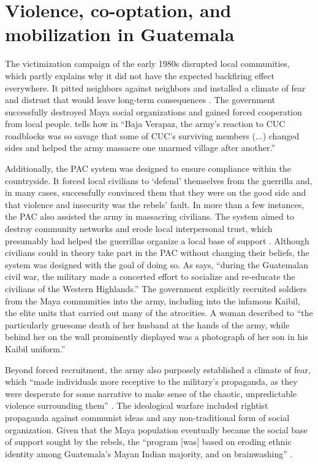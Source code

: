 \documentclass[12pt, notitlepage]{article}
\begin{document}
\section*{Violence, co-optation, and mobilization in Guatemala}

The victimization campaign of the early 1980s disrupted local communities, which partly explains why it did not have the expected backfiring effect everywhere. It pitted neighbors against neighbors and installed a climate of fear and distrust that would leave long-term consequences \citep{Burrell:2013aa}.
The government successfully destroyed Maya social organizations and gained forced cooperation from local people.
\citet[101]{Stoll:1999aa} tells how in ``Baja Verapaz, the army's reaction to CUC roadblocks was so savage that some of CUC's surviving members (...) changed sides and helped the army massacre one unarmed village after another.''

Additionally, the PAC system was designed to ensure compliance within the countryside.
It forced local civilians to `defend' themselves from the guerrilla and, in many cases, successfully convinced them that they were on the good side and that violence and insecurity was the rebels' fault.
In more than a few instances, the PAC also assisted the army in massacring civilians.
The system aimed to destroy community networks and erode local interpersonal trust, which presumably had helped the guerrillas organize a local base of support \citep{SaenzdeTejada:2004aa}.
Although civilians could in theory take part in the PAC without changing their beliefs, the system was designed with the goal of doing so.
As \citet[641]{Bateson:2017aa} says, ``during the Guatemalan civil war, the military made a concerted effort to socialize and re-educate the civilians of the Western Highlands.''
The government explicitly recruited soldiers from the Maya communities into the army, including into the infamous Kaibil, the elite units that carried out many of the atrocities.
A woman described to \citet[112]{Green:1995aa} ``the particularly gruesome death of her husband at the hands of the army, while behind her on the wall prominently displayed was a photograph of her son in his Kaibil uniform.''

Beyond forced recruitment, the army also purposely established a climate of fear, which ``made individuals more receptive to the military's propaganda, as they were desperate for some narrative to make sense of the chaotic, unpredictable violence surrounding them'' \citep[643]{Bateson:2017aa}.
The ideological warfare included rightist propaganda against communist ideas and any non-traditional form of social organization.
Given that the Maya population eventually became the social base of support sought by the rebels, the ``program [was] based on eroding ethnic identity among Guatemala's Mayan Indian majority, and on brainwashing'' \citep[21]{Black:1985aa}.
\end{document}
